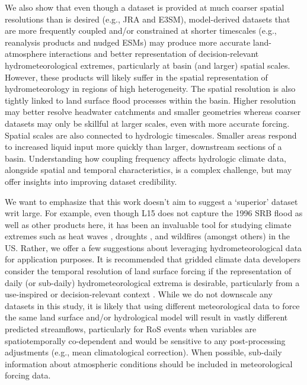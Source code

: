 \documentclass[nhess, manuscript]{copernicus}
\begin{document}
We also show that even though a dataset is provided at much coarser spatial resolutions than is desired (e.g., JRA and E3SM), model-derived datasets that are more frequently coupled and/or constrained at shorter timescales (e.g., reanalysis products and nudged ESMs) may produce more accurate land-atmosphere interactions and better representation of decision-relevant hydrometeorological extremes, particularly at basin (and larger) spatial scales. However, these products will likely suffer in the spatial representation of hydrometeorology in regions of high heterogeneity. The spatial resolution is also tightly linked to land surface flood processes within the basin. Higher resolution may better resolve headwater catchments and smaller geometries whereas coarser datasets may only be skillful at larger scales, even with more accurate forcing. Spatial scales are also connected to hydrologic timescales. Smaller areas respond to increased liquid input more quickly than larger, downstream sections of a basin. Understanding how coupling frequency affects hydrologic climate data, alongside spatial and temporal characteristics, is a complex challenge, but may offer insights into improving dataset credibility.

We want to emphasize that this work doesn't aim to suggest a `superior' dataset writ large. For example, even though L15 does not capture the 1996 SRB flood as well as other products here, it has been an invaluable tool for studying climate extremes such as heat waves \citep{mazdiyasni2015substantial}, droughts \citep{pendergrass2020flash,williams2020large}, and wildfires \citep{williams2019observed} (amongst others) in the US.
Rather, we offer a few suggestions about leveraging hydrometeorological data for application purposes.
It is recommended that gridded climate data developers consider the temporal resolution of land surface forcing if the representation of daily (or sub-daily) hydrometeorological extrema is desirable, particularly from a use-inspired or decision-relevant context \citep{Jagannathan2021}.
While we do not downscale any datasets in this study, it is likely that using different meteorological data to force the same land surface and/or hydrological model will result in vastly different predicted streamflows, particularly for RoS events when variables are spatiotemporally co-dependent and would be sensitive to any post-processing adjustments (e.g., mean climatological correction). When possible, sub-daily information about atmospheric conditions should be included in meteorological forcing data.
\end{document}
